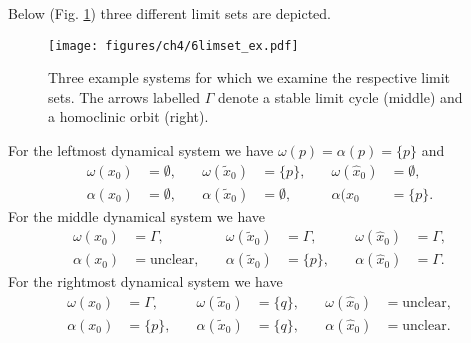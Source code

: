 \begin{ex}
	Below (Fig. \ref{fig:limset_ex}) three different limit sets are depicted.
	\begin{figure}[h!]
		\centering
		\texttt{[image: figures/ch4/6limset\_ex.pdf]}
		\caption{Three example systems for which we examine the respective limit sets. The arrows labelled $\Gamma $ denote a stable limit cycle (middle) and a homoclinic orbit (right).}
		\label{fig:limset_ex}
	\end{figure}
	For the leftmost dynamical system we have $\omega(p)=\alpha(p)=\{p\}$ and
	\begin{subequations}
\begin{align}
	\omega(x_0) &= \emptyset, \quad &\omega(\tilde{x}_0) &= \{p\}, \quad &{\omega }(\hat{x}_0)&= \emptyset, \\
	\alpha(x_0)&=\emptyset, \quad & \alpha(\tilde{x}_0)&=\emptyset,\quad &\alpha(\hat{x}_0&=\{p\}.
\end{align}
\end{subequations}
	For the middle dynamical system we have 
	\begin{subequations}
\begin{align}
	\omega(x_0) &= \Gamma, \quad &\omega(\tilde{x}_0) &= \Gamma, \quad &{\omega }(\hat{x}_0)&= \Gamma, \\
	\alpha(x_0)&= \textrm{unclear} , \quad & \alpha(\tilde{x}_0)&=\{p\},\quad &\alpha(\hat{x}_0)&=\Gamma.
\end{align}
\end{subequations}
	For the rightmost dynamical system we have 
	\begin{subequations}
\begin{align}
	\omega(x_0) &= \Gamma, \quad &\omega(\tilde{x}_0) &= \{q\}, \quad &{\omega }(\hat{x}_0)&=  \textrm{unclear}, \\
	\alpha(x_0)&= \{p\} , \quad & \alpha(\tilde{x}_0)&=\{q\},\quad &\alpha(\hat{x}_0)&= \textrm{unclear} .
\end{align}
\end{subequations}
\end{ex}

